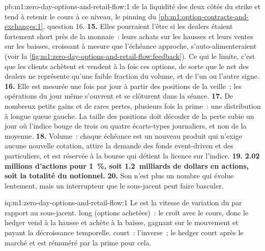 \begin{solution}{pb:m1:zero-day-options-and-retail-flow:1}
de la liquidité des deux côtés du strike et tend à retenir le cours à ce niveau, le
pinning du \cref{pb:m1:option-contracts-and-exchanges:1}, question 16.
\textbf{15.} Elles pourraient l'être si les dealers étaient fortement short  près de la
monnaie~: leurs achats sur les hausses et leurs ventes sur les baisses, croissant à mesure que
l'échéance approche, s'auto-alimenteraient (voir la \cref{fig:m1:zero-day-options-and-retail-flow:feedback}).
Ce qui le limite, c'est que les clients achètent et vendent à la fois ces options, de sorte que
le  net des dealers ne représente qu'une faible fraction du volume, et de l'un ou l'autre signe.
\textbf{16.} Elle est mesurée une fois par jour à partir des positions de la veille~;
les opérations du jour même s'ouvrent et se clôturent dans la séance.
\textbf{17.} De nombreux petits gains et de rares pertes, plusieurs fois la prime~: une
distribution à longue queue gauche. La taille des positions doit découler de la perte
subie un jour où l'indice bouge de trois ou quatre écarts-types journaliers, et non de
la moyenne.
\textbf{18.} Volume~: chaque échéance est un nouveau produit qui n'exige aucune nouvelle
cotation, attire la demande des fonds event-driven et des particuliers, et est réservée à la
bourse qui détient la licence sur l'indice.
\textbf{19.} \textbf{2.02 millions d'actions pour 1~\%, soit 1.2~milliards de dollars
en actions, soit la totalité du notionnel.}
\textbf{20.} Son  n'est plus un nombre qui évolue lentement, mais un interrupteur que
le sous-jacent peut faire basculer.
\end{solution}

\begin{solution}{iq:m1:zero-day-options-and-retail-flow:1}
Le  est la vitesse de variation du  par rapport au sous-jacent.  long
(options achetées)~: le  croît avec le cours, donc le hedger vend à la hausse et
achète à la baisse, gagnant sur le mouvement et payant la décroissance temporelle.  court~:
l'inverse~; le hedger court après le marché et est rémunéré par la prime pour cela.
\end{solution}

